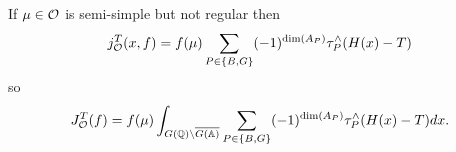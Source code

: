 If $\mu \in {\cal{O}}$ is semi-simple but not regular then 
\[
j_{{\cal{O}}}^T(x,f)
=f(\mu )\sum_{P\in \{B,G\}}(-1)^{\dim (A_P)}
\tau_P^{\wedge }(H(x)-T) 
\]
so 
\begin{equation}
J_{{\cal{O}}}^T(f)=f(\mu )
\int_{G({\Bbb{Q}})\backslash \overline{G({\Bbb{A}})}}
\sum_{P\in \{B,G\}}(-1)^{\dim (A_P)}
\tau _P^{\wedge }(H(x)-T)dx.  \nonumber
\end{equation}


